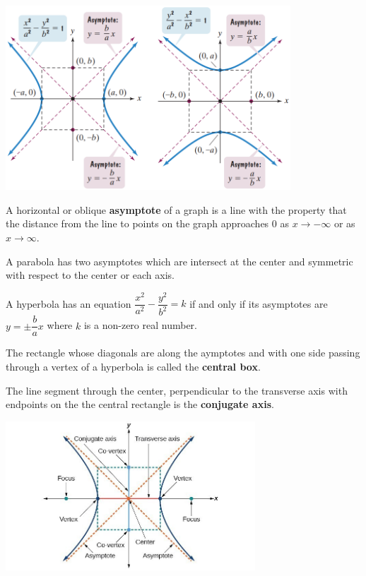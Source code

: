 \begin{center}
    \includegraphics[width=0.8\textwidth,keepaspectratio]{figs/HyperbolaGraphs.png}
\end{center}

\begin{definition}
    A horizontal or oblique \textbf{asymptote} of a graph is a line with the property that the distance from the line to points on the graph approaches 0 as $x\to-\infty$ or as $x\to\infty$.
\end{definition}

A parabola has two asymptotes which are intersect at the center and symmetric with respect to the center or each axis.

\begin{proposition}
    A hyperbola has an equation $\dfrac{x^2}{a^2}-\dfrac{y^2}{b^2}=k$ if and only if its asymptotes are $y=\pm\dfrac{b}{a}x$ where $k$ is a non-zero real number.
\end{proposition}

The rectangle whose diagonals are along the aymptotes and with one side passing through a vertex of a hyperbola is called the \textbf{central box}.

The line segment through the center, perpendicular to the transverse axis with endpoints on the the central rectangle is the \textbf{conjugate axis}.

\begin{center}
    \includegraphics[width=0.7\textwidth,keepaspectratio]{figs/KeyConceptsOfHyperbola.jpg}
\end{center}

